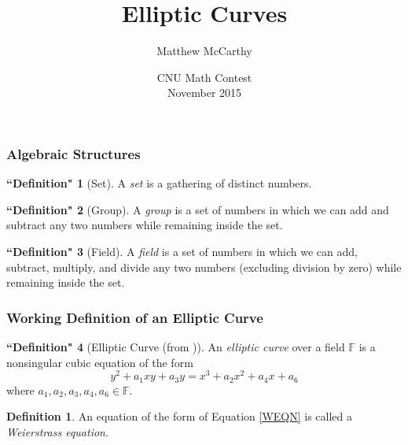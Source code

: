 \documentclass[xcolor=pdftex,dvipsnames,table]{beamer}
\theoremstyle{plain}
\theoremstyle{definition}
\newtheorem{defn}{Definition}
\newtheorem{defns}{``Definition"}
\def\FF{\mathbb{F}}
\begin{document}
\title[Elliptic Curves] %
{Elliptic Curves}
\author[McCarthy] %
{Matthew McCarthy}
\date[11/14/15] %
{CNU Math Contest\\ November 2015}


\frame{\titlepage}

\begin{frame}
	\frametitle{Algebraic Structures}

	\begin{defns}[Set]
		A \textit{set} is a gathering of distinct numbers.
	\end{defns}
	\begin{defns}[Group]
		A \textit{group} is a set of numbers in which we can add and subtract any two numbers while remaining inside the set.
	\end{defns}
	\begin{defns}[Field]
		A \textit{field} is a set of numbers in which we can add, subtract, multiply, and divide any two numbers (excluding division by zero) while remaining inside the set.
	\end{defns}
\end{frame}

\begin{frame}
	\frametitle{Working Definition of an Elliptic Curve}
	
	\begin{defns}[Elliptic Curve (from \cite{AEC})]
		An \textit{elliptic curve} over a field $\FF$ is a nonsingular cubic equation of the form
		\begin{equation}\label{WEQN}
		y^2+a_1xy+a_3y=x^3+a_2x^2+a_4x+a_6
		\end{equation}
		where $a_1,a_2,a_3,a_4,a_6\in\FF$.
	\end{defns}
	\begin{defn}
		An equation of the form of Equation \autoref{WEQN} is called a \textit{Weierstrass equation}.
	\end{defn}
\end{frame}
\end{document}
